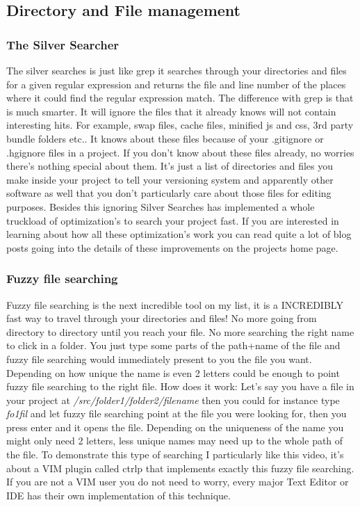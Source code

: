\documentclass[paper=a4, fontsize=10pt]{scrartcl} %
\numberwithin{equation}{section} %
\numberwithin{figure}{section} %
\numberwithin{table}{section} %
\begin{document}
\subsection{Directory and File management}

\subsubsection{The Silver Searcher\cite{ag}}
The silver searches is just like grep it searches  through your directories and
files for a given regular expression and returns the file and line number of the
places where it could find the regular expression match. The difference with
grep is that is much smarter. It will ignore the files that it already knows
will not contain interesting hits. For example, swap files, cache files,
minified js and css, 3rd party bundle folders etc.. It knows about these files
because of your .gitignore or .hgignore files in a project. If you don't know
about these files already, no worries there's nothing special about them. It's
just a list of directories and files you make inside your project to tell your
versioning system and apparently other software as well that you don't
particularly care about those files for editing purposes. Besides this ignoring
Silver Searches has implemented a whole truckload of optimization's to search
your project fast. If you are interested in learning about how all these
optimization's work you can read quite a lot of blog posts going into the details
of these improvements on the projects home page\cite{ag}. 

\subsubsection{Fuzzy file searching}
Fuzzy file searching is the next incredible tool on my list, it is a
INCREDIBLY fast way to travel through your directories and files! No more going
from directory to directory until you reach your file. No more searching the
right name to click in a folder. You just type some parts of the path+name of the
file and fuzzy file searching would immediately present to you the file you
want. Depending on how unique the name is even 2 letters could be enough to
point fuzzy file searching to the right file.  How does it work: Let's say you
have a file in your project at \emph{/src/folder1/folder2/filename} then you could for
instance type \emph{fo1fil} and let fuzzy file searching point at the file you were
looking for, then you press enter and it opens the file. Depending on the
uniqueness of the name you might only need 2 letters, less unique names may
need up to the whole path of
the file. To demonstrate this type of searching I particularly like this
video\cite{ctrlpvideo}, it's about a VIM plugin called ctrlp that implements
exactly this fuzzy file searching. If you are not a VIM user you do not need to
worry, every major Text Editor or IDE has their own implementation of this
technique.
\end{document}

